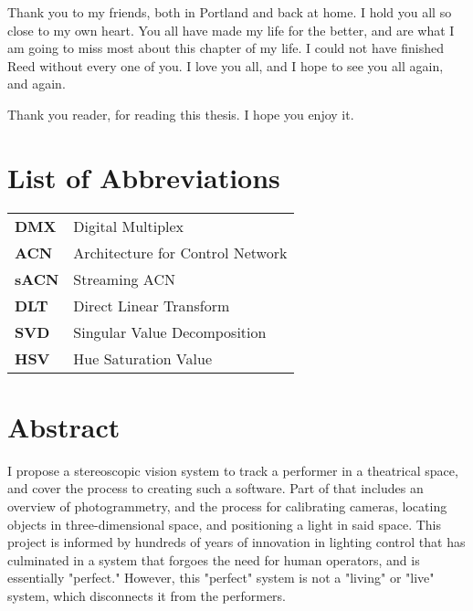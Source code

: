 \documentclass[
    12pt,
    twoside,
    bibstyle=chicago,
    headerstyle=uppercase,
	bibfile=biblatex_updating.bib
]{reedthesis}
\begin{document}
	Thank you to my friends, both in Portland and back at home. I hold you all so close to my own heart. You all have made my life for the better, and are what I am going to miss most about this chapter of my life. I could not have finished Reed without every one of you. I love you all, and I hope to see you all again, and again.

	Thank you reader, for reading this thesis. I hope you enjoy it.
	

    \chapter*{List of Abbreviations}

	\begin{table}[h]
	\centering %
	\begin{tabular}{ll}
		\textbf{DMX}  	&  Digital Multiplex \\
		\textbf{ACN}	&  Architecture for Control Network\\
		\textbf{sACN}  	&  Streaming ACN\\
		\textbf{DLT} 	&  Direct Linear Transform\\
		\textbf{SVD}	&  Singular Value Decomposition\\
		\textbf{HSV}	&  Hue Saturation Value\\
	\end{tabular}
	\end{table}
	

    \tableofcontents
    \listoffigures


    \chapter*{Abstract}
	I propose a stereoscopic vision system to track a performer in a theatrical space, and cover the process to creating such a software. Part of that includes an overview of photogrammetry, and the process for calibrating cameras, locating objects in three-dimensional space, and positioning a light in said space. This project is informed by hundreds of years of innovation in lighting control that has culminated in a system that forgoes the need for human operators, and is essentially "perfect." However, this "perfect" system is not a "living" or "live" system, which disconnects it from the performers.
\end{document}
